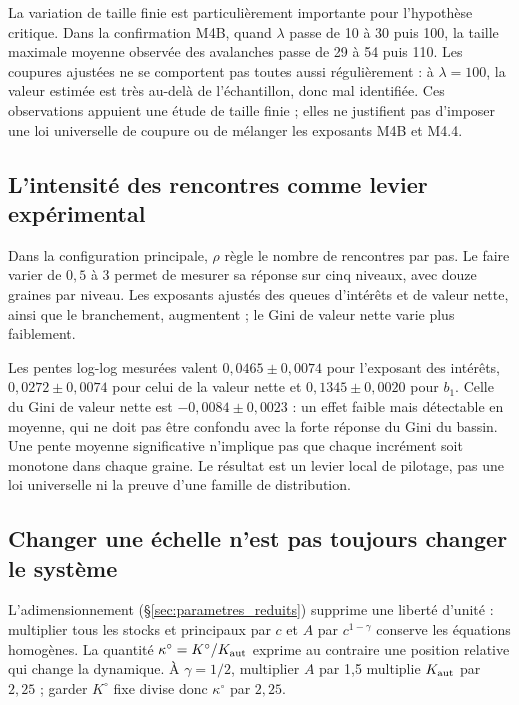 La variation de taille finie est particulièrement importante pour
l'hypothèse critique. Dans la confirmation M4B, quand $\lambda$ passe
de 10 à 30 puis 100, la taille maximale moyenne observée des avalanches
passe de 29 à 54 puis 110. Les coupures ajustées ne se comportent pas
toutes aussi régulièrement : à $\lambda=100$, la valeur estimée est
très au-delà de l'échantillon, donc mal identifiée. Ces observations
appuient une étude de taille finie ; elles ne justifient pas d'imposer
une loi universelle de coupure ou de mélanger les exposants M4B et M4.4.

\subsection{L'intensité des rencontres comme levier expérimental}
Dans la configuration principale, $\rho$ règle le nombre de rencontres
par pas. Le faire varier de $0{,}5$ à $3$ permet de mesurer sa réponse
sur cinq niveaux, avec douze graines par niveau. Les exposants ajustés
des queues d'intérêts et de valeur nette, ainsi que le branchement,
augmentent ; le Gini de valeur nette varie plus faiblement.


Les pentes log-log mesurées valent $0{,}0465\pm0{,}0074$ pour
l'exposant des intérêts, $0{,}0272\pm0{,}0074$ pour celui de la valeur
nette et $0{,}1345\pm0{,}0020$ pour $b_1$. Celle du Gini de valeur nette
est $-0{,}0084\pm0{,}0023$ : un effet faible mais détectable en moyenne,
qui ne doit pas être confondu avec la forte réponse du Gini du bassin.
Une pente moyenne significative n'implique pas que chaque incrément soit
monotone dans chaque graine. Le résultat est un levier local de pilotage,
pas une loi universelle ni la preuve d'une famille de distribution.

\subsection{Changer une échelle n'est pas toujours changer le système}
L'adimensionnement (§\ref{sec:parametres_reduits}) supprime une liberté
d'unité : multiplier tous les stocks et principaux par $c$ et $A$ par
$c^{1-\gamma}$ conserve les équations homogènes. La quantité
$\kappa^\circ=K^\circ/K_{\rm aut}$ exprime au contraire une position
relative qui change la dynamique. À $\gamma=1/2$, multiplier $A$ par
1,5 multiplie $K_{\rm aut}$ par $2{,}25$ ; garder $K^\circ$ fixe
divise donc $\kappa^\circ$ par $2{,}25$.

